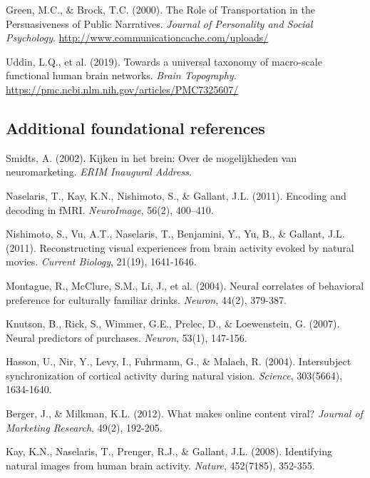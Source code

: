 \documentclass[11pt,letterpaper]{article}
\begin{document}
\begin{list}{}{\setlength{\leftmargin}{2em}\setlength{\itemindent}{-2em}\setlength{\itemsep}{2pt}}
\item[{[78]}] Green, M.C., \& Brock, T.C. (2000). The Role of Transportation in the Persuasiveness of Public Narratives. \textit{Journal of Personality and Social Psychology}. \url{http://www.communicationcache.com/uploads/}
\item[{[79]}] Uddin, L.Q., et al. (2019). Towards a universal taxonomy of macro-scale functional human brain networks. \textit{Brain Topography}. \url{https://pmc.ncbi.nlm.nih.gov/articles/PMC7325607/}
\end{list}
\endgroup

\subsection*{Additional foundational references}
\begingroup
\small
\begin{list}{}{\setlength{\leftmargin}{2em}\setlength{\itemindent}{-2em}\setlength{\itemsep}{2pt}}
\item[{[R1]}] Smidts, A. (2002). Kijken in het brein: Over de mogelijkheden van neuromarketing. \textit{ERIM Inaugural Address}.
\item[{[R2]}] Naselaris, T., Kay, K.N., Nishimoto, S., \& Gallant, J.L. (2011). Encoding and decoding in fMRI. \textit{NeuroImage}, 56(2), 400--410.
\item[{[R3]}] Nishimoto, S., Vu, A.T., Naselaris, T., Benjamini, Y., Yu, B., \& Gallant, J.L. (2011). Reconstructing visual experiences from brain activity evoked by natural movies. \textit{Current Biology}, 21(19), 1641-1646.
\item[{[R4]}] Montague, R., McClure, S.M., Li, J., et al. (2004). Neural correlates of behavioral preference for culturally familiar drinks. \textit{Neuron}, 44(2), 379-387.
\item[{[R5]}] Knutson, B., Rick, S., Wimmer, G.E., Prelec, D., \& Loewenstein, G. (2007). Neural predictors of purchases. \textit{Neuron}, 53(1), 147-156.
\item[{[R6]}] Hasson, U., Nir, Y., Levy, I., Fuhrmann, G., \& Malach, R. (2004). Intersubject synchronization of cortical activity during natural vision. \textit{Science}, 303(5664), 1634-1640.
\item[{[R7]}] Berger, J., \& Milkman, K.L. (2012). What makes online content viral? \textit{Journal of Marketing Research}, 49(2), 192-205.
\item[{[R8]}] Kay, K.N., Naselaris, T., Prenger, R.J., \& Gallant, J.L. (2008). Identifying natural images from human brain activity. \textit{Nature}, 452(7185), 352-355.

\end{list}
\end{document}
